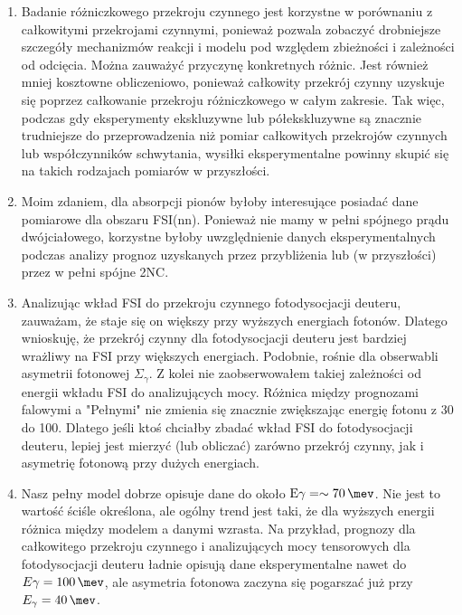 \documentclass[a4paper, 14pt]{extarticle}
\begin{document}
\begin{enumerate}
badanym rz\k{e}dzie chiralnym N$^4$LO+ jest znacznie ni\.zsza ni\.z rozrzut prognoz z r\'o\.znymi
wartościami odci\k{e}cia.
Podobnie jest obserwowane w przypadku, gdzie wzgl\k{e}dny b\l{}\k{a}d uciania N$^4$LO+ przy $S=\SI{10}{\mev}$ wynosi \SI{2.2}{\percent}, podczas gdy
wzgl\k{e}dny rozrzut odci\k{e}cia wynosi \SI{9.0}{\percent}.
\item Badanie r\'o\.zniczkowego przekroju czynnego jest korzystne w por\'ownaniu z ca\l{}kowitymi przekrojami czynnymi, poniewa\.z pozwala zobaczy\'c drobniejsze szczeg\'o\l{}y mechanizm\'ow reakcji i modelu pod wzgl\k{e}dem zbie\.zności i zale\.zności od odci\k{e}cia. Mo\.zna zauwa\.zy\'c przyczyn\k{e} konkretnych r\'o\.znic.
Jest r\'ownie\.z mniej kosztowne obliczeniowo, poniewa\.z ca\l{}kowity przekr\'oj czynny uzyskuje si\k{e} poprzez ca\l{}kowanie przekroju r\'o\.zniczkowego w ca\l{}ym zakresie.
Tak wi\k{e}c, podczas gdy eksperymenty ekskluzywne lub p\'o\l{}ekskluzywne s\k{a} znacznie trudniejsze do przeprowadzenia ni\.z pomiar ca\l{}kowitych przekroj\'ow czynnych lub wsp\'o\l{}czynnik\'ow schwytania, wysi\l{}ki eksperymentalne powinny skupi\'c si\k{e} na takich rodzajach pomiar\'ow w przysz\l{}ości.
\item Moim zdaniem, dla absorpcji pion\'ow by\l{}oby interesuj\k{a}ce posiada\'c dane pomiarowe dla obszaru FSI(nn). Poniewa\.z nie mamy w pe\l{}ni sp\'ojnego pr\k{a}du dw\'ojcia\l{}owego, korzystne by\l{}oby uwzgl\k{e}dnienie danych eksperymentalnych podczas analizy prognoz uzyskanych przez przybli\.zenia lub (w przysz\l{}ości) przez w pe\l{}ni sp\'ojne 2NC.
\item Analizuj\k{a}c wk\l{}ad FSI do przekroju czynnego fotodysocjacji deuteru, zauwa\.zam, \.ze staje si\k{e} on wi\k{e}kszy przy wy\.zszych energiach foton\'ow.
Dlatego wnioskuj\k{e}, \.ze przekr\'oj czynny dla fotodysocjacji deuteru jest
bardziej wra\.zliwy na FSI przy wi\k{e}kszych energiach.
Podobnie, rośnie dla obserwabli asymetrii fotonowej $\Sigma_\gamma$.
Z kolei nie zaobserwowa\l{}em takiej zale\.zności od energii wk\l{}adu FSI do analizuj\k{a}cych mocy.
R\'o\.znica mi\k{e}dzy prognozami falowymi a "Pe\l{}nymi"
nie zmienia si\k{e} znacznie zwi\k{e}kszaj\k{a}c energi\k{e} fotonu z \SI{30}{\mev} do \SI{100}{\mev}.
Dlatego jeśli ktoś chcia\l{}by zbada\'c wk\l{}ad FSI do fotodysocjacji deuteru,
lepiej jest mierzy\'c (lub oblicza\'c) zar\'owno przekr\'oj czynny, jak i asymetri\k{e} fotonow\k{a} przy du\.zych energiach.
\item Nasz pe\l{}ny model dobrze opisuje dane do oko\l{}o $\text{E}\gamma = \sim\SI{70}{\mev}$. Nie jest to wartoś\'c ściśle określona, ale og\'olny trend jest taki, \.ze dla wy\.zszych energii r\'o\.znica mi\k{e}dzy modelem a danymi wzrasta. Na przyk\l{}ad, prognozy dla ca\l{}kowitego przekroju czynnego i analizuj\k{a}cych mocy tensorowych dla fotodysocjacji deuteru \l{}adnie opisuj\k{a} dane eksperymentalne nawet do $E\gamma = \SI{100}{\mev}$, ale asymetria fotonowa zaczyna si\k{e} pogarsza\'c ju\.z przy $E_\gamma = \SI{40}{\mev}$.

\end{enumerate}
\end{document}
